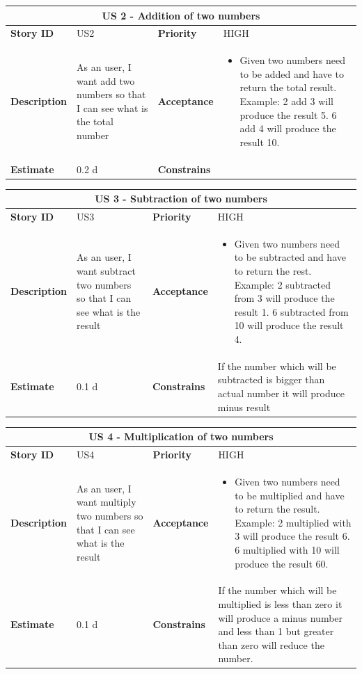 \documentclass{article}
\begin{document}
\begin{tabular}{ |p{2cm}|p{5cm}|p{2cm}|p{4cm}| }
 \hline
 \multicolumn{4}{|c|}{US 2 - Addition of two numbers} \\
 \hline
 \textbf {Story ID}& US2 &  \textbf{Priority} & HIGH \\
 \hline
  \textbf{Description}   & As an user, I want add two numbers so that I can see what is the total number &    \textbf{Acceptance}& 
\begin{itemize}
\item Given two numbers need to be added and have to return the total result. Example: 2 add 3 will produce the result 5. 6 add 4 will produce the result 10. 
\end{itemize}
  \\
 \hline
 \textbf{Estimate} & 0.2 d &  \textbf{Constrains}&   \\
 \hline
\end{tabular}

\begin{tabular}{ |p{2cm}|p{5cm}|p{2cm}|p{4cm}| }
 \hline
 \multicolumn{4}{|c|}{US 3 - Subtraction of two numbers} \\
 \hline
 \textbf {Story ID}& US3 &  \textbf{Priority} & HIGH \\
 \hline
  \textbf{Description}   & As an user, I want subtract two numbers so that I can see what is the result &    \textbf{Acceptance}& 
\begin{itemize}
\item Given two numbers need to be subtracted and have to return the rest. Example: 2 subtracted from 3 will produce the result 1. 6 subtracted from 10 will produce the result 4. 
\end{itemize}
  \\
 \hline
 \textbf{Estimate} & 0.1 d &  \textbf{Constrains}&  If the number which will be subtracted is bigger than actual number it will produce minus result  \\
 \hline
\end{tabular}

\begin{tabular}{ |p{2cm}|p{5cm}|p{2cm}|p{4cm}| }
 \hline
 \multicolumn{4}{|c|}{US 4 - Multiplication of two numbers} \\
 \hline
 \textbf {Story ID}& US4 &  \textbf{Priority} & HIGH \\
 \hline
  \textbf{Description}   & As an user, I want multiply two numbers so that I can see what is the result &    \textbf{Acceptance}& 
\begin{itemize}
\item Given two numbers need to be multiplied and have to return the result. Example: 2 multiplied with 3 will produce the result 6. 6 multiplied with 10 will produce the result 60. 
\end{itemize}
  \\
 \hline
 \textbf{Estimate} & 0.1 d &  \textbf{Constrains}&  If the number which will be multiplied is less than zero it will produce a minus number and  less than 1 but greater than zero will reduce the number. \\
 \hline
\end{tabular}
\end{document}
